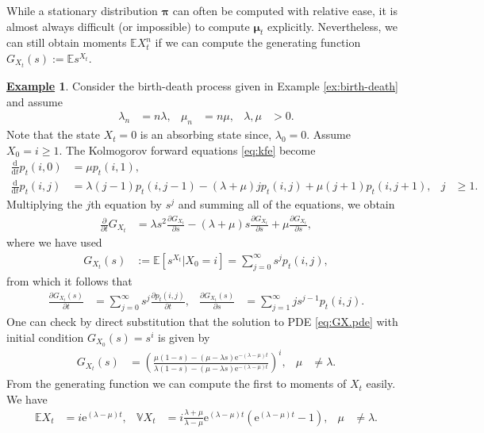 \documentclass[12pt]{book}
\numberwithin{equation}{chapter}
\theoremstyle{plain}
\numberwithin{theorem}{section}
\theoremstyle{definition}
\newtheorem{example}[theorem]{\underline{Example}}
\numberwithin{exercise}{chapter}
\newcommand{\<}{\langle}
\renewcommand{\>}{\rangle}
\renewcommand{\(}{\left(}
\renewcommand{\)}{\right)}
\renewcommand{\[}{\left[}
\renewcommand{\]}{\right]}
\newcommand\Eb{\mathds{E}}
\newcommand\Vb{\mathds{V}}
\newcommand\lam{\lambda}
\newcommand\muv{\pmb{\mu}}
\newcommand\piv{\pmb{\pi}}
\renewcommand\d{\partial}
\newcommand\dd{\mathrm{d}}
\newcommand\ee{\mathrm{e}}
\begin{document}
\noindent
While a stationary distribution $\piv$ can often be computed with relative ease, it is almost always difficult (or impossible) to compute $\muv_t$ explicitly.  Nevertheless, we can still obtain moments $\Eb X_t^n$ if we can compute the generating function $G_{X_t}(s):=\Eb s^{X_t}$.

\begin{example}
Consider the birth-death process given in Example \ref{ex:birth-death} and assume 
\begin{align}
\lam_n
	&=	n \lam , &
\mu_n
	&=	n \mu , &
\lam , \mu
	&> 0 .
\end{align}
Note that the state $X_t = 0$ is an absorbing state since, $\lam_0 = 0$.  Assume $X_0 = i \geq 1$.  The Kolmogorov forward equations \eqref{eq:kfe} become
\begin{align}
\frac{\dd}{\dd t}p_t(i,0)
	&=	\mu p_t(i,1) , \\
\frac{\dd}{\dd t}p_t(i,j)
	&=	\lam (j-1) p_t(i,j-1) - (\lam + \mu) j p_t(i,j) + \mu ( j + 1) p_t(i,j+1) , &
j
	& \geq 1 .
\end{align}
Multiplying the $j$th equation by $s^j$ and summing all of the equations, we obtain
\begin{align}
\frac{\d }{\d t}G_{X_t}
	&=	\lam s^2 \frac{\d G_{X_t}}{\d s} - (\lam + \mu) s \frac{\d G_{X_t}}{\d s} + \mu \frac{\d G_{X_t}}{\d s} , \label{eq:GX.pde}
\end{align}
where we have used
\begin{align}
G_{X_t}(s)
	&:=	\Eb[ s^{X_t} | X_0 = i ] 
	=		\sum_{j=0}^\infty s^j p_t(i,j) , 
\end{align}
from which it follows that
\begin{align}
\frac{\d G_{X_t}(s)}{\d t}
	&=	\sum_{j=0}^\infty s^j \frac{\d p_t(i,j) }{\d t} , &
\frac{\d G_{X_t}(s)}{\d s}
	&=	\sum_{j=1}^\infty j s^{j-1} p_t(i,j) .
\end{align}
One can check by direct substitution that the solution to PDE \eqref{eq:GX.pde} with initial condition $G_{X_0}(s) = s^i$ is given by
\begin{align}
G_{X_t}(s)
	&=	\( \frac{\mu(1-s) - (\mu - \lam s)\ee^{-(\lam-\mu)t}}{\lam(1-s) - (\mu - \lam s)\ee^{-(\lam-\mu)t}} \)^i , &
\mu 
	&\neq \lam .
\end{align}
From the generating function we can compute the first to moments of $X_t$ easily.  We have
\begin{align}
\Eb X_t
	&=	i \ee^{(\lam-\mu)t} , &
\Vb X_t
	&=	i \frac{\lam + \mu}{\lam-\mu}\ee^{(\lam-\mu)t}\(\ee^{(\lam-\mu)t} - 1 \) , &
\mu
	&\neq \lam .
\end{align}
\end{example}
\end{document}
